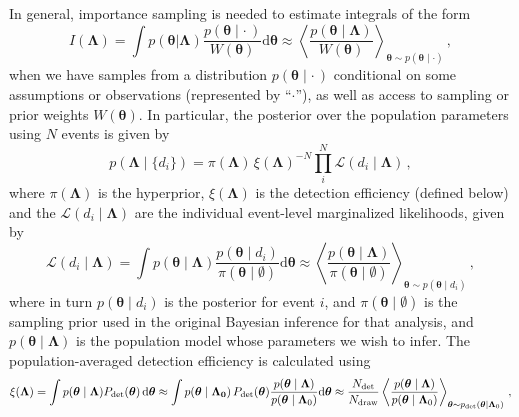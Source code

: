 \documentclass[twocolumn,usenames,dvipsnames,linenumbers]{aastex631}
\begin{document}
In general, importance sampling is needed to estimate integrals of the form
\begin{equation}
	\label{eq:generic-integral}
	I(\boldsymbol{\Lambda}) = \int p(\boldsymbol{\theta} | \boldsymbol{\Lambda}) \frac{p(\boldsymbol{\theta} \mid \cdot\, )}{W(\boldsymbol{\theta})} \mathrm{d}\boldsymbol{\theta} 
	\approx \left\langle   \frac{p(\boldsymbol{\theta} \mid \boldsymbol{\Lambda})}{W(\boldsymbol{\theta})}  \right\rangle_{\boldsymbol{\theta} \sim p(\boldsymbol{\theta}\mid \cdot)}\, ,
\end{equation} 
when we have samples from a distribution $p(\boldsymbol{\theta}\mid \cdot\,)$ conditional on some assumptions or observations (represented by ``$\cdot$''), as well as access to sampling or prior weights $W(\boldsymbol{\theta})$. 
In particular, the posterior over the population parameters using $N$ events is given by
\begin{equation}
	p(\boldsymbol{\Lambda} \mid \{d_i\}) = \pi(\boldsymbol{\Lambda})\, \xi(\boldsymbol{\Lambda})^{-N}\prod_{i}^N \mathcal{L}(d_i \mid \boldsymbol{\Lambda}) \,,
	\label{eq:populationposterior}
\end{equation}
where $\pi(\boldsymbol{\Lambda})$ is the hyperprior, $\xi(\boldsymbol{\Lambda})$ is the detection efficiency (defined below) and the $\mathcal{L}(d_i \mid \boldsymbol{\Lambda})$ are the individual event-level marginalized likelihoods, given by
\begin{equation}
	\mathcal{L}(d_i \mid \boldsymbol{\Lambda})=\int  p(\boldsymbol{\theta} \mid \boldsymbol{\Lambda}) \frac{p(\boldsymbol{\theta} \mid d_i)}{\pi(\boldsymbol{\theta} \mid \emptyset)} \mathrm{d}\boldsymbol{\theta}
	\approx \left\langle   \frac{p(\boldsymbol{\theta} \mid \boldsymbol{\Lambda})}{\pi(\boldsymbol{\theta} \mid \emptyset)}  
	\right\rangle_{\boldsymbol{\theta} \sim p(\boldsymbol{\theta} \mid d_i)}\,,
	\label{eq:eventpoplikelihood}
\end{equation}
where in turn $p(\boldsymbol{\theta} \mid d_i)$ is the posterior for event $i$, and $\pi(\boldsymbol{\theta} \mid \emptyset)$ is the sampling prior used in the original Bayesian inference for that analysis, and $p(\boldsymbol{\theta} \mid \boldsymbol{\Lambda})$ is the population model whose parameters we wish to infer. 
The population-averaged detection efficiency is calculated using
\begin{equation}
	\xi(\boldsymbol{\Lambda}) =  \int p(\boldsymbol{\theta} \mid \boldsymbol{\Lambda})  P_{\rm det}(\boldsymbol{\theta})\, \mathrm{d}\boldsymbol{\theta} \approx  \int p(\boldsymbol{\theta} \mid \boldsymbol{\Lambda_0})\,  P_{\rm det}(\boldsymbol{\theta}) \frac{p(\boldsymbol{\theta} \mid \boldsymbol{\Lambda})}{p(\boldsymbol{\theta} \mid \boldsymbol{\Lambda}_0)} \mathrm{d}\boldsymbol{\theta} 
	\approx
	\frac{N_{\rm det}}{N_{\rm draw}} \left\langle \frac{p(\boldsymbol{\theta} \mid \boldsymbol{\Lambda})}{p(\boldsymbol{\theta} \mid \boldsymbol{\Lambda}_0)}  \right\rangle_{\boldsymbol{\theta} \sim p_{\rm det}(\boldsymbol{\theta} | \boldsymbol{\Lambda}_0)}\, ,
	\label{eq:detectionefficiency}
\end{equation}
\end{document}
